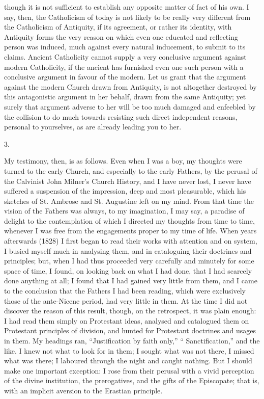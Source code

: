 though it is not sufficient to establish any opposite matter of fact
of his own. I say, then, the Catholicism of today is not likely to be
really very different from the Catholicism of Antiquity, if its
agreement, or rather its identity, with Antiquity forms the very
reason on which even one educated and reflecting person was induced,
much against every natural inducement, to submit to its claims.
Ancient Catholicity cannot supply a very conclusive argument against
modern Catholicity, if the ancient has furnished even one such person
with a conclusive argument in favour of the modern. Let us grant that
the argument against the modern Church drawn from Antiquity, is not
altogether destroyed by this antagonistic argument in her behalf,
drawn from the same Antiquity; yet surely that argument adverse to her
will be too much damaged and enfeebled by the collision to do much
towards resisting such direct independent reasons, personal to
yourselves, as are already leading you to her.

3.

My testimony, then, is as follows. Even when I was a boy, my
thoughts were turned to the early Church, and especially to the early
Fathers, by the perusal of the Calvinist John Milner's Church History,
and I have never lost, I never have suffered a suspension of the
impression, deep and most pleasurable, which his sketches of St.
Ambrose and St. Augustine left on my mind. From that time the vision
of the Fathers was always, to my imagination, I may say, a paradise of
delight to the contemplation of which I directed my thoughts from time
to time, whenever I was free from the engagements proper to my time of
life. When years afterwards (1828) I first began to read their works
with attention and on system, I busied myself much in analysing them,
and in cataloguing their doctrines and principles; but, when I had
thus proceeded very carefully and minutely for some space of time, I
found, on looking back on what I had done, that I had scarcely done
anything at all; I found that I had gained very little from them, and
I came to the conclusion that the Fathers I had been reading, which
were exclusively those of the ante-Nicene period, had very little in
them. At the time I did not discover the reason of this result,
though, on the retrospect, it was plain enough: I had read them simply
on Protestant ideas, analysed and catalogued them on Protestant
principles of division, and hunted for Protestant doctrines and usages
in them. My headings ran, ``Justification by faith only,''
`` Sanctification,'' and the like. I knew not what to look for
in them; I sought what was not there, I missed what was there; I
laboured through the night and caught nothing. But I should make one
important exception: I rose from their perusal with a vivid perception
of the divine institution, the prerogatives, and the gifts of the
Episcopate; that is, with an implicit aversion to the Erastian
principle.


